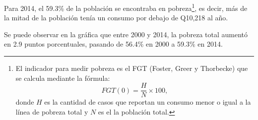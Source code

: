 Para 2014, el 59.3\% de la población se encontraba en pobreza\footnote{El indicador para medir pobreza es el FGT (Foster, Greer y Thorbecke) que se calcula mediante la fórmula: \[ FGT(0)  = \frac{H}{N}\times 100,  \] donde $H$  es la cantidad de casos que reportan un consumo  menor o igual a la línea de pobreza total y $N$ es el la población total.}, es decir, más de la mitad de la población tenía un consumo por debajo de Q10,218 al año. 

Se puede observar en la gráfica  que entre 2000 y 2014, la pobreza total aumentó en 2.9 puntos porcentuales, pasando de 56.4\% en 2000 a 59.3\% en 2014.